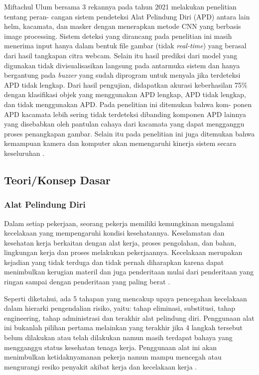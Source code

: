 Miftachul Ulum bersama 3 rekannya pada tahun 2021 melakukan penelitian tentang peran-
cangan sistem pendeteksi Alat Pelindung Diri (APD) antara lain helm, kacamata, dan masker
dengan menerapkan metode CNN yang berbasis image processing. Sistem deteksi yang dirancang pada penelitian ini masih menerima input hanya dalam bentuk file gambar (tidak \emph{real-time}) yang berasal dari hasil tangkapan citra webcam. Selain itu hasil prediksi dari model yang digunakan tidak divisualisasikan langsung pada antarmuka sistem dan hanya bergantung pada \emph{buzzer} yang sudah diprogram untuk menyala jika terdeteksi APD tidak lengkap.
Dari hasil pengujian, didapatkan akurasi keberhasilan 75\% dengan klasifikasi objek yang menggunakan APD lengkap,
APD tidak lengkap, dan tidak menggunakan APD. Pada penelitian ini ditemukan bahwa kom-
ponen APD kacamata lebih sering tidak terdeteksi dibanding komponen APD lainnya yang
disebabkan oleh pantulan cahaya dari kacamata yang dapat mengganggu proses penangkapan gambar. Selain itu pada penelitian ini juga ditemukan bahwa kemampuan kamera dan komputer
akan memengaruhi kinerja sistem secara keseluruhan \cite{miftachul_2021}.

\subsection{Teori/Konsep Dasar}

\subsubsection{Alat Pelindung Diri}
\label{apd}

Dalam setiap pekerjaan, seorang pekerja memiliki kemungkinan mengalami kecelakaan yang mempengaruhi kondisi kesehatannya. Keselamatan dan kesehatan kerja berkaitan dengan alat kerja, proses pengolahan, dan bahan, lingkungan kerja dan proses melakukan pekerjaannya. Kecelakaan merupakan kejadian yang tidak terduga dan tidak pernah diharapkan karena dapat menimbulkan kerugian materil dan juga penderitaan mulai dari penderitaan yang ringan sampai dengan penderitaan yang paling berat \cite{anizar2012}.

Seperti diketahui, ada 5 tahapan yang mencakup upaya pencegahan kecelakaan dalam hierarki pengendalian risiko, yaitu: tahap eliminasi, substitusi, tahap engineering, tahap administrasi dan terakhir alat pelindung diri. Penggunaan alat ini bukanlah pilihan pertama melainkan yang terakhir jika 4 langkah tersebut belum dilakukan atau telah dilakukan namun masih terdapat bahaya yang mengganggu status kesehatan tenaga kerja. Penggunaan alat ini akan menimbulkan ketidaknyamanan pekerja namun mampu mencegah atau mengurangi resiko penyakit akibat kerja dan kecelakaan kerja \cite{k3ptglobal}.

